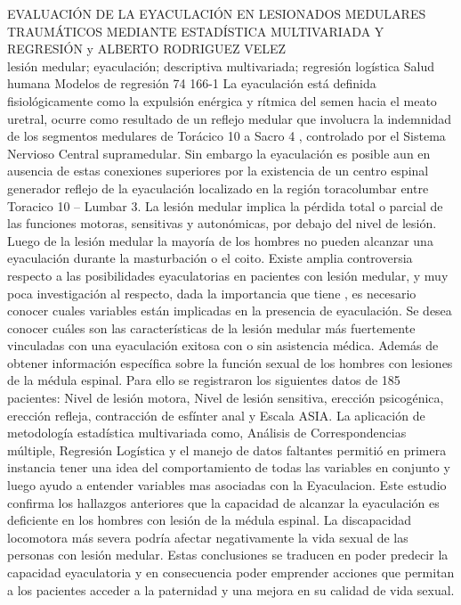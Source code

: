 \A
{EVALUACIÓN DE LA EYACULACIÓN EN LESIONADOS MEDULARES TRAUMÁTICOS MEDIANTE ESTADÍSTICA MULTIVARIADA Y REGRESIÓN}
{ y ALBERTO RODRIGUEZ VELEZ}
{
\\}
{lesión medular; eyaculación; descriptiva multivariada; regresión logística} 
 {Salud humana} 
 {Modelos de regresión} 
 {74} 
 {166-1}
{La eyaculación está definida fisiológicamente como la expulsión enérgica y rítmica del semen hacia el meato uretral, ocurre como resultado de un reflejo medular que involucra la indemnidad de los segmentos medulares de Torácico 10 a Sacro 4 , controlado por el Sistema Nervioso Central supramedular. Sin embargo la eyaculación es posible aun en ausencia de estas conexiones superiores por la existencia de un centro espinal generador reflejo de la eyaculación localizado en la región toracolumbar entre Toracico 10 – Lumbar 3. La lesión medular implica la pérdida total o parcial de las funciones motoras, sensitivas y autonómicas, por debajo del nivel de lesión. Luego de la lesión medular la mayoría de los hombres no pueden alcanzar una eyaculación durante la masturbación o el coito. Existe amplia controversia respecto a las posibilidades eyaculatorias en pacientes con lesión medular, y muy poca investigación al respecto, dada la importancia que tiene , es necesario conocer cuales variables están implicadas en la presencia de eyaculación. Se desea conocer cuáles son las características de la lesión medular más fuertemente vinculadas con una eyaculación exitosa con o sin asistencia médica. Además de obtener información específica sobre la función sexual de los hombres con lesiones de la médula espinal. Para ello se registraron los siguientes datos de 185 pacientes: Nivel de lesión motora, Nivel de lesión sensitiva, erección psicogénica, erección refleja, contracción de esfínter anal y Escala ASIA. La aplicación de metodología estadística multivariada como, Análisis de Correspondencias múltiple, Regresión Logística y el manejo de datos faltantes permitió en primera instancia tener una idea del comportamiento de todas las variables en conjunto y luego ayudo a entender variables mas asociadas con la Eyaculacion. Este estudio confirma los hallazgos anteriores que la capacidad de alcanzar la eyaculación es deficiente en los hombres con lesión de la médula espinal. La discapacidad locomotora más severa podría afectar negativamente la vida sexual de las personas con lesión medular. Estas conclusiones se traducen en poder predecir la capacidad eyaculatoria y en consecuencia poder emprender acciones que permitan a los pacientes acceder a la paternidad y una mejora en su calidad de vida sexual.  }

